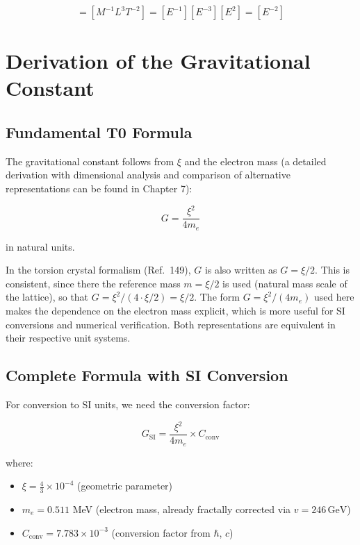 \begin{equation}
	[G] = [M^{-1}L^3T^{-2}] = [E^{-1}][E^{-3}][E^2] = [E^{-2}]
	\label{eq:G_dimension}
\end{equation}

\section{Derivation of the Gravitational Constant}

\subsection{Fundamental T0 Formula}

The gravitational constant follows from $\xi$ and the electron mass (a 
detailed derivation with dimensional analysis and comparison of alternative 
representations can be found in Chapter 7):

\begin{equation}
	G = \frac{\xi^2}{4 m_e}
	\label{eq:G_fundamental}
\end{equation}

in natural units.

\begin{remark}[Alternative representation: $G = \xi/2$]
	In the torsion crystal formalism (Ref.\ 149), $G$ is also written as 
	$G = \xi/2$. This is consistent, since there the reference mass $m = \xi/2$ 
	is used (natural mass scale of the lattice), so that 
	$G = \xi^2/(4 \cdot \xi/2) = \xi/2$. The form $G = \xi^2/(4 m_e)$ used here 
	makes the dependence on the electron mass explicit, which is more useful for 
	SI conversions and numerical verification. Both representations are equivalent 
	in their respective unit systems.
\end{remark}

\subsection{Complete Formula with SI Conversion}

For conversion to SI units, we need the conversion factor:

\begin{equation}
	\boxed{G_{\text{SI}} = \frac{\xi^2}{4 m_e} \times C_{\text{conv}}}
	\label{eq:G_complete}
\end{equation}

where:
\begin{itemize}
	\item $\xi = \frac{4}{3} \times 10^{-4}$ (geometric parameter)
	\item $m_e = 0.511$ MeV (electron mass, already fractally corrected via $v = 246\,\text{GeV}$)
	\item $C_{\text{conv}} = 7.783 \times 10^{-3}$ (conversion factor from $\hbar$, $c$)
\end{itemize}

